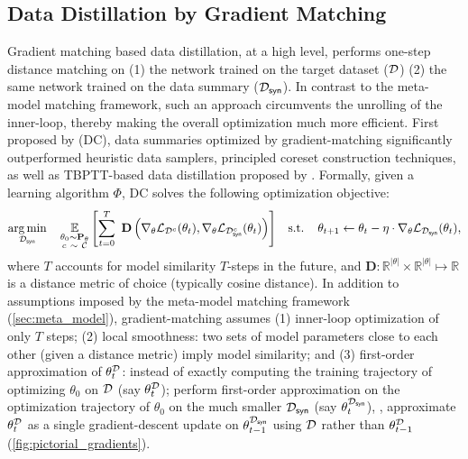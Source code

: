 \documentclass[10pt]{article} %
\begin{document}
\subsection{Data Distillation by Gradient Matching} \label{sec:grad_matching}
Gradient matching based data distillation, at a high level, performs one-step distance matching on (1) the network trained on the target dataset ($\mathcal{D}$) \vs (2) the same network trained on the data summary ($\mathcal{D}_{\mathsf{syn}}$). In contrast to the meta-model matching framework, such an approach circumvents the unrolling of the inner-loop, thereby making the overall optimization much more efficient. 
First proposed by \citet{zhao_dc} (DC), data summaries optimized by gradient-matching significantly outperformed heuristic data samplers, principled coreset construction techniques, as well as TBPTT-based data distillation proposed by \citet{dd_orig}. Formally, given a learning algorithm $\Phi$, DC solves the following optimization objective:
\begin{equation} \label{eqn:gradient_matching}
\begin{gathered}
    \underset{\mathcal{D}_{\mathsf{syn}}}{\operatorname{arg} \operatorname{min}} \hspace{0.4cm} \underset{\substack{\theta_0 \sim \mathbf{P}_\theta\\c ~\sim~ \mathcal{C}}}{\mathbb{E}} \left[\sum_{t=0}^T ~ \mathbf{D}\left( \nabla_\theta \mathcal{L}_{\mathcal{D}^c}(\theta_t), \nabla_\theta \mathcal{L}_{\mathcal{D}_{\mathsf{syn}}^c}(\theta_t) \right)\right] \hspace{0.3cm}
    \text{s.t.} \hspace{0.4cm} \theta_{t+1} \leftarrow \theta_t - \eta \cdot \nabla_\theta \mathcal{L}_{\mathcal{D}_{\mathsf{syn}}}(\theta_t),
\end{gathered}
\end{equation}
where $T$ accounts for model similarity $T$-steps in the future, and $\mathbf{D} : \mathbb{R}^{|\theta|} \times \mathbb{R}^{|\theta|} \mapsto \mathbb{R}$ is a distance metric of choice (typically cosine distance). 
In addition to assumptions imposed by the meta-model matching framework (\cref{sec:meta_model}), gradient-matching assumes (1) inner-loop optimization of only $T$ steps; (2) local smoothness: two sets of model parameters close to each other (given a distance metric) imply model similarity; and (3) first-order approximation of $\theta_t^{\mathcal{D}}$: instead of exactly computing the training trajectory of optimizing $\theta_0$ on $\mathcal{D}$ (say $\theta_t^{\mathcal{D}}$); perform first-order approximation on the optimization trajectory of $\theta_0$ on the much smaller $\mathcal{D}_{\mathsf{syn}}$ (say $\theta_t^{\mathcal{D}_{\mathsf{syn}}}$), \ie, approximate $\theta_t^{\mathcal{D}}$ as a single gradient-descent update on $\theta_{t-1}^{\mathcal{D}_{\mathsf{syn}}}$ using $\mathcal{D}$ rather than $\theta_{t-1}^{\mathcal{D}}$ (\cref{fig:pictorial_gradients}).
\end{document}

